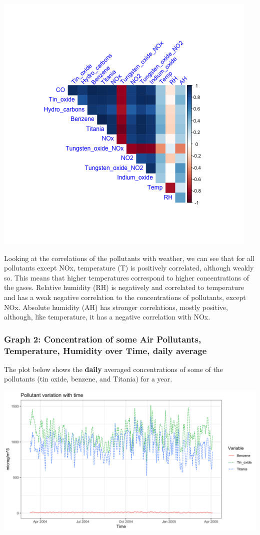 \documentclass[]{article}
\begin{document}
\includegraphics{../Images/correlation.png}

Looking at the correlations of the pollutants with weather, we can see
that for all pollutants except NOx, temperature (T) is positively
correlated, although weakly so. This means that higher temperatures
correspond to higher concentrations of the gases. Relative humidity (RH)
is negatively and correlated to temperature and has a weak negative
correlation to the concentrations of pollutants, except NOx. Absolute
humidity (AH) has stronger correlations, mostly positive, although, like
temperature, it has a negative correlation with NOx.

\hypertarget{graph-2-concentration-of-some-air-pollutants-temperature-humidity-over-time-daily-average}{%
\subsubsection{Graph 2: Concentration of some Air Pollutants,
Temperature, Humidity over Time, daily
average}\label{graph-2-concentration-of-some-air-pollutants-temperature-humidity-over-time-daily-average}}

The plot below shows the \textbf{daily} averaged concentrations of some
of the pollutants (tin oxide, benzene, and Titania) for a year.

\includegraphics{../Images/pollutantsvstime.png}
\end{document}
